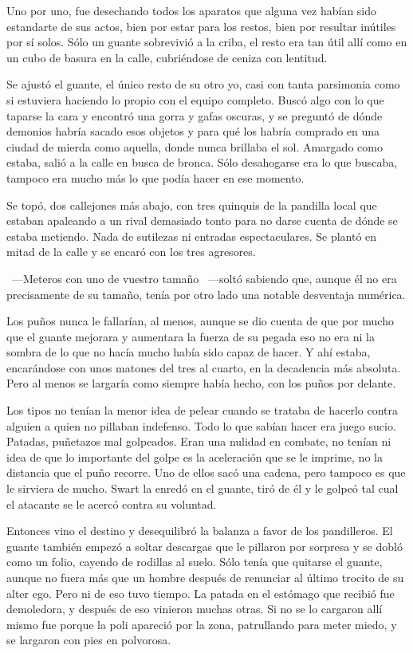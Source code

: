 Uno por uno, fue desechando todos los aparatos que alguna vez habían sido estandarte de sus actos, bien por estar para los restos, bien por resultar inútiles por sí solos. Sólo un guante sobrevivió a la criba, el resto era tan útil allí como en un cubo de basura en la calle, cubriéndose de ceniza con lentitud.

Se ajustó el guante, el único resto de su otro yo, casi con tanta parsimonia como si estuviera haciendo lo propio con el equipo completo. Buscó algo con lo que taparse la cara y encontró una gorra y gafas oscuras, y se preguntó de dónde demonios habría sacado esos objetos y para qué los habría comprado en una ciudad de mierda como aquella, donde nunca brillaba el sol. Amargado como estaba, salió a la calle en busca de bronca. Sólo desahogarse era lo que buscaba, tampoco era mucho más lo que podía hacer en ese momento.

Se topó, dos callejones más abajo, con tres quinquis de la pandilla local que estaban apaleando a un rival demasiado tonto para no darse cuenta de dónde se estaba metiendo. Nada de sutilezas ni entradas espectaculares. Se plantó en mitad de la calle y se encaró con los tres agresores.

~---Meteros con uno de vuestro tamaño ~---soltó sabiendo que, aunque él no era precisamente de su tamaño, tenía por otro lado una notable desventaja numérica.

Los puños nunca le fallarían, al menos, aunque se dio cuenta de que por mucho que el guante mejorara y aumentara la fuerza de su pegada eso no era ni la sombra de lo que no hacía mucho había sido capaz de hacer. Y ahí estaba, encarándose con unos matones del tres al cuarto, en la decadencia más absoluta. Pero al menos se largaría como siempre había hecho, con los puños por delante.

Los tipos no tenían la menor idea de pelear cuando se trataba de hacerlo contra alguien a quien no pillaban indefenso. Todo lo que sabían hacer era juego sucio. Patadas, puñetazos mal golpeados. Eran una nulidad en combate, no tenían ni idea de que lo importante del golpe es la aceleración que se le imprime, no la distancia que el puño recorre. Uno de ellos sacó una cadena, pero tampoco es que le sirviera de mucho. Swart la enredó en el guante, tiró de él y le golpeó tal cual el atacante se le acercó contra su voluntad.

Entonces vino el destino y desequilibró la balanza a favor de los pandilleros. El guante también empezó a soltar descargas que le pillaron por sorpresa y se dobló como un folio, cayendo de rodillas al suelo. Sólo tenía que quitarse el guante, aunque no fuera más que un hombre después de renunciar al último trocito de su alter ego. Pero ni de eso tuvo tiempo. La patada en el estómago que recibió fue demoledora, y después de eso vinieron muchas otras. Si no se lo cargaron allí mismo fue porque la poli apareció por la zona, patrullando para meter miedo, y se largaron con pies en polvorosa.

